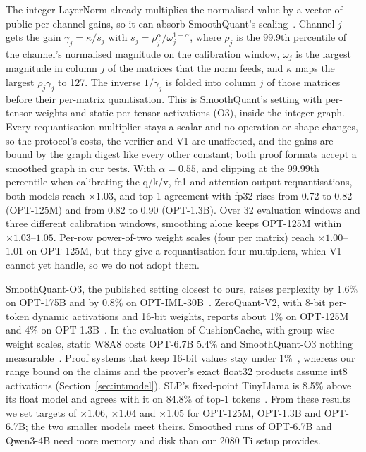  The integer LayerNorm already multiplies the
normalised value by a vector of public per-channel gains, so it can absorb SmoothQuant's
scaling~\cite{xiao2023smoothquant}. Channel $j$ gets the gain $\gamma_j=\kappa/s_j$ with
$s_j=\rho_j^{\alpha}/\omega_j^{1-\alpha}$, where $\rho_j$ is the 99.9th percentile of the channel's
normalised magnitude on the calibration window, $\omega_j$ is the largest magnitude in column $j$
of the matrices that the norm feeds, and $\kappa$ maps the largest $\rho_j\gamma_j$ to 127. The
inverse $1/\gamma_j$ is folded into column $j$ of those matrices before their per-matrix
quantisation. This is SmoothQuant's setting with per-tensor weights and static per-tensor
activations (O3), inside the integer graph. Every requantisation multiplier stays a scalar and no
operation or shape changes, so the protocol's costs, the verifier and V1 are unaffected, and the
gains are bound by the graph digest like every other constant; both proof formats accept a
smoothed graph in our tests. With $\alpha=0.55$, and clipping at the 99.99th percentile when
calibrating the q/k/v, fc1 and attention-output requantisations, both models reach $\times1.03$,
and top-1 agreement with fp32 rises from 0.72 to 0.82 (OPT-125M) and from 0.82 to 0.90
(OPT-1.3B). Over 32 evaluation windows and three different calibration windows, smoothing alone
keeps OPT-125M within $\times1.03$--$1.05$. Per-row power-of-two weight scales (four per matrix)
reach $\times1.00$--$1.01$ on OPT-125M, but they give a requantisation four multipliers, which V1
cannot yet handle, so we do not adopt them.

 SmoothQuant-O3, the published setting closest to
ours, raises perplexity by 1.6\% on OPT-175B and by 0.8\% on
OPT-IML-30B~\cite{xiao2023smoothquant}. ZeroQuant-V2, with 8-bit per-token dynamic activations
and 16-bit weights, reports about 1\% on OPT-125M and 4\% on OPT-1.3B~\cite{yao2023zeroquantv2}.
In the evaluation of CushionCache, with group-wise weight scales, static W8A8 costs OPT-6.7B
5.4\% and SmoothQuant-O3 nothing measurable~\cite{son2024cushioncache}. Proof systems that keep
16-bit values stay under 1\%~\cite{zkllm,zkgpt}, whereas our range bound on the claims and the
prover's exact float32 products assume int8 activations (Section~\ref{sec:intmodel}). SLP's fixed-point TinyLlama is 8.5\%
above its float model and agrees with it on 84.8\% of top-1 tokens~\cite{slp}. From these results
we set targets of $\times1.06$, $\times1.04$ and $\times1.05$ for OPT-125M, OPT-1.3B and
OPT-6.7B; the two smaller models meet theirs. Smoothed runs of OPT-6.7B and Qwen3-4B need more
memory and disk than our 2080 Ti setup provides.  
